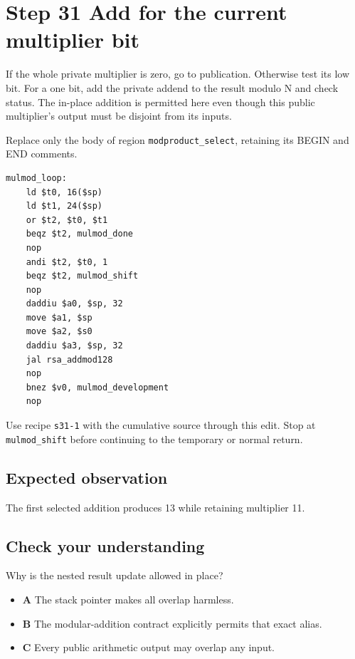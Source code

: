 \section{Step 31 Add for the current multiplier bit}\label{rsa-s31}

If the whole private multiplier is zero, go to publication. Otherwise test its low bit. For a one bit, add the private addend to the result modulo N and check status. The in-place addition is permitted here even though this public multiplier's output must be disjoint from its inputs.

Replace only the body of region \texttt{modproduct\_select}, retaining its BEGIN and END comments.

\begin{verbatim}
mulmod_loop:
    ld $t0, 16($sp)
    ld $t1, 24($sp)
    or $t2, $t0, $t1
    beqz $t2, mulmod_done
    nop
    andi $t2, $t0, 1
    beqz $t2, mulmod_shift
    nop
    daddiu $a0, $sp, 32
    move $a1, $sp
    move $a2, $s0
    daddiu $a3, $sp, 32
    jal rsa_addmod128
    nop
    bnez $v0, mulmod_development
    nop
\end{verbatim}

Use recipe \texttt{s31-1} with the cumulative source through this edit. Stop at \texttt{mulmod\_shift} before continuing to the temporary or normal return.

\subsection{Expected observation}
The first selected addition produces 13 while retaining multiplier 11.

\subsection{Check your understanding}
Why is the nested result update allowed in place?

\begin{itemize}
  \item \textbf{A} The stack pointer makes all overlap harmless.
  \item \textbf{B} The modular-addition contract explicitly permits that exact alias.
  \item \textbf{C} Every public arithmetic output may overlap any input.
\end{itemize}
